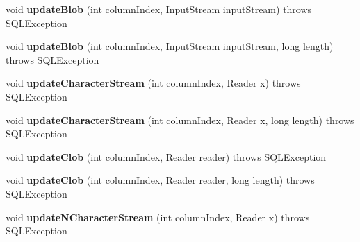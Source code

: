 \begin{DoxyCompactItemize}
\item 
\mbox{\label{classcom_1_1mysql_1_1jdbc_1_1_j_d_b_c4_updatable_result_set_a49074d8cc135859fe505ca3208af5c1e}} 
void {\bfseries update\+Blob} (int column\+Index, Input\+Stream input\+Stream)  throws S\+Q\+L\+Exception 
\item 
\mbox{\label{classcom_1_1mysql_1_1jdbc_1_1_j_d_b_c4_updatable_result_set_a15272e657408593d504fd952b92cdea5}} 
void {\bfseries update\+Blob} (int column\+Index, Input\+Stream input\+Stream, long length)  throws S\+Q\+L\+Exception 
\item 
\mbox{\label{classcom_1_1mysql_1_1jdbc_1_1_j_d_b_c4_updatable_result_set_afe9db9a8510c277f204b744517d043a5}} 
void {\bfseries update\+Character\+Stream} (int column\+Index, Reader x)  throws S\+Q\+L\+Exception 
\item 
\mbox{\label{classcom_1_1mysql_1_1jdbc_1_1_j_d_b_c4_updatable_result_set_a97feb6a4316080d1166114f5de0f1885}} 
void {\bfseries update\+Character\+Stream} (int column\+Index, Reader x, long length)  throws S\+Q\+L\+Exception 
\item 
\mbox{\label{classcom_1_1mysql_1_1jdbc_1_1_j_d_b_c4_updatable_result_set_adbc81d2814b0e67f1439c455c150ba3b}} 
void {\bfseries update\+Clob} (int column\+Index, Reader reader)  throws S\+Q\+L\+Exception 
\item 
\mbox{\label{classcom_1_1mysql_1_1jdbc_1_1_j_d_b_c4_updatable_result_set_a560d38214b9128e5b5be47d9d6c755d9}} 
void {\bfseries update\+Clob} (int column\+Index, Reader reader, long length)  throws S\+Q\+L\+Exception 
\item 
\mbox{\label{classcom_1_1mysql_1_1jdbc_1_1_j_d_b_c4_updatable_result_set_a7ccef47929164a7be57b96d936768e73}} 
void {\bfseries update\+N\+Character\+Stream} (int column\+Index, Reader x)  throws S\+Q\+L\+Exception 
\item 

\end{DoxyCompactItemize}
